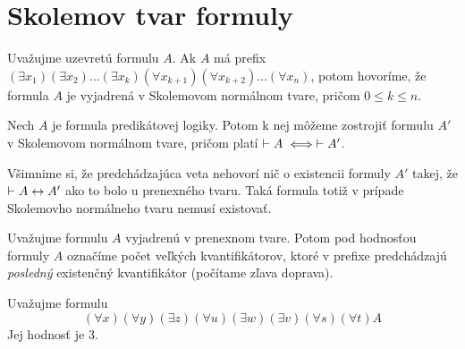 \section{Skolemov tvar formuly}

\begin{definicia}
  Uvažujme uzevretú formulu $A$.
  Ak $A$ má prefix $(\exists x_1)(\exists x_2) \dots (\exists x_k)
    (\forall x_{k+1}) (\forall x_{k+2}) \dots (\forall x_n)$, potom 
    hovoríme, že formula $A$ je vyjadrená v Skolemovom normálnom
    tvare, pričom $0 \le k \le n$.
\end{definicia}

\begin{veta}
    Nech $A$ je formula predikátovej logiky. Potom k nej môžeme
    zostrojiť formulu $A'$ v Skolemovom normálnom tvare, pričom platí
    $\vdash A \iff \vdash A'$.
    \label{veta:skolem}
\end{veta}

\begin{poznamka}
    Všimnime si, že predchádzajúca veta nehovorí nič o existencii
    formuly $A'$ takej, že $\vdash A \leftrightarrow A'$ ako to
    bolo u prenexného tvaru. Taká formula totiž v prípade Skolemovho
    normálneho tvaru nemusí existovať.
\end{poznamka}

\begin{definicia}
    Uvažujme formulu $A$ vyjadrenú v prenexnom tvare. Potom pod
    hodnosťou formuly $A$ označíme počet veľkých kvantifikátorov,
    ktoré v prefixe predchádzajú \emph{posledný} existenčný
    kvantifikátor (počítame zľava doprava).
\end{definicia}

\begin{priklad}
    Uvažujme formulu
    \begin{equation*}
        (\forall x) (\forall y) (\exists z) 
        (\forall u) (\exists w) (\exists v)
        (\forall s) (\forall t) A
    \end{equation*}
    Jej hodnosť je 3.
\end{priklad}

\def\existsxton{(\exists x_1) (\exists x_2) \dots (\exists x_n)}
\def\forallxton{(\forall x_1) (\forall x_2) \dots (\forall x_n)}


